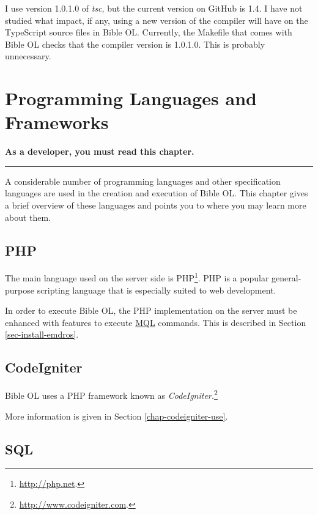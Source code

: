 \documentclass[11pt,oneside,a4paper]{memoir}
\begin{document}
I use version 1.0.1.0 of \emph{tsc}, but the current version on GitHub is 1.4. I have not studied
what impact, if any, using a new version of the compiler will have on the TypeScript source files in
Bible OL. Currently, the Makefile that comes with Bible OL checks that the compiler version is
1.0.1.0. This is probably unnecessary.



\chapter{Programming Languages and Frameworks}\label{chap-proglang}

\textbf{As a developer, you must read this chapter.}
\plainbreak{3}

A considerable number of programming languages and other specification languages are used in the
creation and execution of Bible OL. This chapter gives a brief overview of these languages and
points you to where you may learn more about them.


\section{PHP}

The main language used on the server side is PHP\footnote{\url{http://php.net}.}. PHP is a popular
general-purpose scripting language that is especially suited to web development.

In order to execute Bible OL, the PHP implementation on the server must be enhanced with features to
execute \hyperref[sec-mql]{MQL} commands. This is described in Section \ref{sec-install-emdros}.

\section{CodeIgniter}\label{sec-codeigniter}

Bible OL uses a PHP framework known as \emph{CodeIgniter.}\footnote{\url{http://www.codeigniter.com}.}

More information is given in Section \ref{chap-codeigniter-use}.


\section{SQL}
\end{document}
